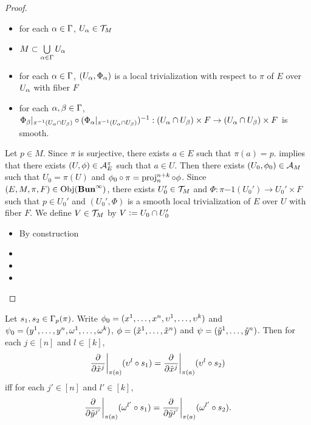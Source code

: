 \documentclass{book}
\begin{document}
\begin{proof}\
	\begin{itemize}
		\item for each $\alpha \in \Gamma$, $U_{\alpha} \in \mathcal{T}_M$
		\item $M \subset \bigcup\limits_{\alpha \in \Gamma} U_{\alpha}$ 
		\item for each $\alpha \in \Gamma$, $(U_{\alpha}, \Phi_{\alpha})$ is a local trivialization with respect to $\pi$ of $E$ over $U_{\alpha}$ with fiber $F$ 
		\item for each $\alpha,\beta \in \Gamma$, $\Phi_{\beta}|_{\pi^{-1}(U_{\alpha} \cap U_{\beta})} \circ (\Phi_{\alpha}|_{\pi^{-1}(U_{\alpha} \cap U_{\beta})})^{-1}: (U_{\alpha} \cap U_{\beta}) \times F \rightarrow  (U_{\alpha} \cap U_{\beta}) \times F$ is smooth.
	\end{itemize}
	Let $p \in M$. Since $\pi$ is surjective, there exists $a \in E$ such that $\pi(a) = p$.  implies that there exists $(U, \phi) \in \mathcal{A}_E^{\pi}$ such that $a \in U$. Then there exists $(U_0, \phi_0) \in \mathcal{A}_M$ such that $U_0 = \pi(U)$ and $\phi_0 \circ \pi = \operatorname{\text{proj}}^{n+k}_n \circ \phi$. Since $(E, M, \pi, F) \in \operatorname{Obj}(\operatorname*{\text{\textbf{Bun}}^{\infty}})$, there exists $U_0' \in \mathcal{T}_M$ and $\Phi: \pi{-1}(U_0') \rightarrow U_0' \times F$ such that $p \in U_0'$ and $(U_0', \Phi)$ is a smooth local trivialization of $E$ over $U$ with fiber $F$. We define $V \in \mathcal{T}_M$ by $V \vcentcolon= U_0 \cap U_0'$
	\begin{itemize}
		\item By construction
		\item 
		\item 
		\item 
	\end{itemize}
\end{proof}

























\newpage

\begin{ex}
	Let $s_1, s_2 \in \Gamma_p(\pi)$. Write $\phi_0 = (x^1, \ldots, x^n, \upsilon^1, \ldots, \upsilon^k)$ and $\psi_0 = (y^1, \ldots, y^n, \omega^1, \ldots, \omega^k)$, $\phi = (\tilde{x}^1, \ldots, \tilde{x}^n)$ and $\psi = (\tilde{y}^1, \ldots, \tilde{y}^n)$. Then for each $j \in [n]$ and $l \in [k]$, 
	$$\frac{\partial}{\partial \tilde{x}^j} \bigg|_{\pi(a)} ( \upsilon^l \circ s_1 ) = \frac{\partial}{\partial \tilde{x}^j} \bigg|_{\pi(a)} ( \upsilon^l \circ s_2 ) $$
	iff for each $j' \in [n]$ and $l' \in [k]$, 
	$$\frac{\partial}{\partial \tilde{y}^{j'}} \bigg|_{\pi(a)} ( \omega^{l'} \circ s_1 ) = \frac{\partial}{\partial \tilde{y}^{j'}} \bigg|_{\pi(a)} ( \omega^{l'} \circ s_2 ).$$
\end{ex}
\end{document}

